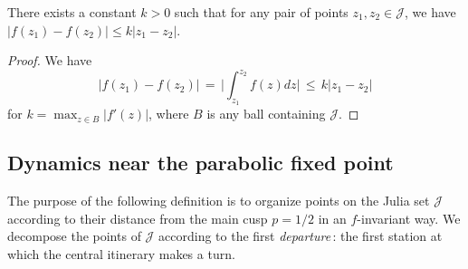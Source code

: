 
\begin{lemma}
\label{expansion factor}
There exists a constant $k>0$ such that for any pair of points $z_1, z_2 \in \mathcal J$, we have 
$|f(z_1)-f(z_2)| \leq k|z_1-z_2|$.
\end{lemma}

\begin{proof}
	We have 
	\begin{equation}
		|f(z_1)-f(z_2)| \, = \,  \biggl | \int_{z_1} ^{z_2} f(z) dz \biggr | 
  \, \leq \, k|z_1-z_2|	
	\end{equation}
for $k=\max_{z \in B} |f'(z)|$, where $B$ is any ball containing $\mathcal J$. 
\end{proof}
 
\subsection{Dynamics near the parabolic fixed point}

The purpose of the following definition is to organize points on the Julia set $\mathcal J$ according to their distance from the main cusp $p=1/2$ in an $f$-invariant way. We decompose the points of $\mathcal J$ according to the first \emph{departure}\,: the first station at which the central itinerary makes a turn.

